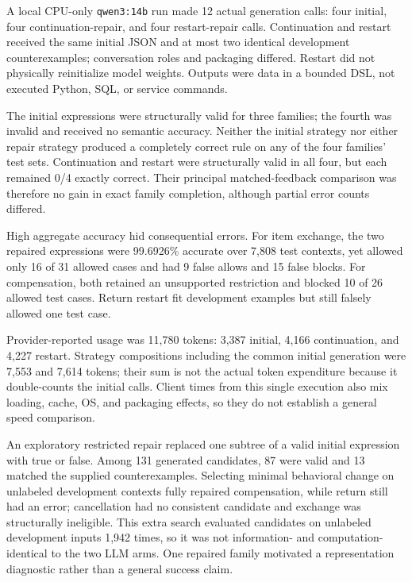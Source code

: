\documentclass[10pt,twocolumn,letterpaper]{article}
\begin{document}
A local CPU-only \texttt{qwen3:14b} run made 12 actual generation calls: four initial, four continuation-repair, and four restart-repair calls. Continuation and restart received the same initial JSON and at most two identical development counterexamples; conversation roles and packaging differed. Restart did not physically reinitialize model weights. Outputs were data in a bounded DSL, not executed Python, SQL, or service commands.

The initial expressions were structurally valid for three families; the fourth was invalid and received no semantic accuracy. Neither the initial strategy nor either repair strategy produced a completely correct rule on any of the four families' test sets. Continuation and restart were structurally valid in all four, but each remained 0/4 exactly correct. Their principal matched-feedback comparison was therefore no gain in exact family completion, although partial error counts differed.

High aggregate accuracy hid consequential errors. For item exchange, the two repaired expressions were 99.6926\% accurate over 7,808 test contexts, yet allowed only 16 of 31 allowed cases and had 9 false allows and 15 false blocks. For compensation, both retained an unsupported restriction and blocked 10 of 26 allowed test cases. Return restart fit development examples but still falsely allowed one test case.

Provider-reported usage was 11,780 tokens: 3,387 initial, 4,166 continuation, and 4,227 restart. Strategy compositions including the common initial generation were 7,553 and 7,614 tokens; their sum is not the actual token expenditure because it double-counts the initial calls. Client times from this single execution also mix loading, cache, OS, and packaging effects, so they do not establish a general speed comparison.

An exploratory restricted repair replaced one subtree of a valid initial expression with true or false. Among 131 generated candidates, 87 were valid and 13 matched the supplied counterexamples. Selecting minimal behavioral change on unlabeled development contexts fully repaired compensation, while return still had an error; cancellation had no consistent candidate and exchange was structurally ineligible. This extra search evaluated candidates on unlabeled development inputs 1,942 times, so it was not information- and computation-identical to the two LLM arms. One repaired family motivated a representation diagnostic rather than a general success claim.
\end{document}

